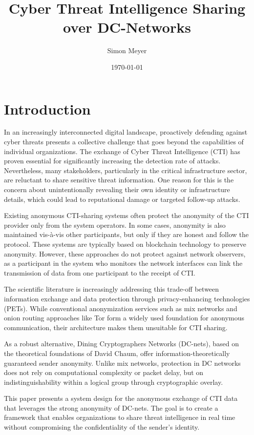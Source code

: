 \documentclass{article}
\title{Cyber Threat Intelligence Sharing over DC-Networks}
\author{Simon Meyer}
\date{\today}
\begin{document}
\maketitle

\section{Introduction}

In an increasingly interconnected digital landscape, proactively defending against cyber threats presents a collective challenge that goes beyond the capabilities of individual organizations.
The exchange of Cyber Threat Intelligence (CTI) has proven essential for significantly increasing the detection rate of attacks.
Nevertheless, many stakeholders, particularly in the critical infrastructure sector, are reluctant to share sensitive threat information.
One reason for this is the concern about unintentionally revealing their own identity or infrastructure details, which could lead to reputational damage or targeted follow-up attacks.

Existing anonymous CTI-sharing systems often protect the anonymity of the CTI provider only from the system operators.
In some cases, anonymity is also maintained vis-à-vis other participants, but only if they are honest and follow the protocol.
These systems are typically based on blockchain technology to preserve anonymity.
However, these approaches do not protect against network observers, as a participant in the system who monitors the network interfaces can link the transmission of data from one participant to the receipt of CTI.

The scientific literature is increasingly addressing this trade-off between information exchange and data protection through privacy-enhancing technologies (PETs).
While conventional anonymization services such as mix networks and onion routing approaches like Tor form a widely used foundation for anonymous communication, their architecture makes them unsuitable for CTI sharing.

As a robust alternative, Dining Cryptographers Networks (DC-nets), based on the theoretical foundations of David Chaum, offer information-theoretically guaranteed sender anonymity.
Unlike mix networks, protection in DC networks does not rely on computational complexity or packet delay, but on indistinguishability within a logical group through cryptographic overlay.

This paper presents a system design for the anonymous exchange of CTI data that leverages the strong anonymity of DC-nets.
The goal is to create a framework that enables organizations to share threat intelligence in real time without compromising the confidentiality of the sender’s identity.
\end{document}
